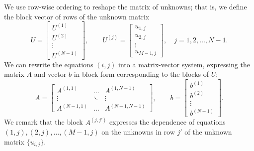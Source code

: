 \documentclass{homework}
\begin{document}
\begin{alphaparts}
		We use row-wise ordering to reshape the matrix of unknowns; that is, we define the block vector of rows of the unknown matrix
		\begin{equation*}
			U = \left[\begin{matrix}U^{(1)} \\ U^{(2)} \\ \vdots \\ U^{(N-1)}\end{matrix}\right], \qquad U^{(j)} = \left[\begin{matrix}u_{1,j} \\ u_{2,j} \\ \vdots \\ u_{M-1,j}\end{matrix}\right], \quad j =1,2,\dots, N-1.
		\end{equation*}
		We can rewrite the equations $(i,j)$ into a matrix-vector system, expressing the matrix $A$ and vector $b$ in block form corresponding to the blocks of $U$:
		\begin{equation*}
			A = \left[\begin{matrix}A^{(1,1)} &\hdots& A^{(1,N-1)} \\\vdots &\ddots & \vdots \\ A^{(N-1,1)} & \hdots & A^{(N-1,N-1)}\end{matrix}\right], \qquad b = \left[\begin{matrix}b^{(1)} \\ b^{(2)} \\ \vdots \\ b^{(N-1)}\end{matrix}\right].
		\end{equation*}
		We remark that the block $A^{(j,j')}$ expresses the dependence of equations $(1,j), (2,j), \dots, (M-1,j)$ on the unknowns in row $j'$ of the unknown matrix $\{u_{i,j}\}$. 
		

\end{alphaparts}
\end{document}
